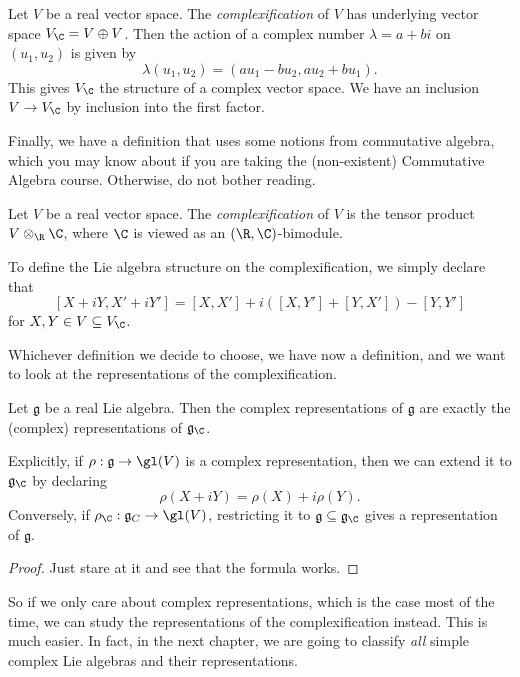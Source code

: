 \documentclass[a4paper]{article}
\begin{document}
\begin{defi}[Complexification II]
  Let $V$ be a real vector space. The \emph{complexification} of $V$ has underlying vector space $V_\C = V \oplus V$. Then the action of a complex number $\lambda = a + bi$ on $(u_1, u_2)$ is given by
  \[
    \lambda (u_1, u_2) = (au_1 - bu_2, a u_2 + bu_1).
  \]
  This gives $V_\C$ the structure of a complex vector space. We have an inclusion $V \to V_\C$ by inclusion into the first factor.
\end{defi}

Finally, we have a definition that uses some notions from commutative algebra, which you may know about if you are taking the (non-existent) Commutative Algebra course. Otherwise, do not bother reading.
\begin{defi}
  Let $V$ be a real vector space. The \emph{complexification} of $V$ is the tensor product $V \otimes_\R \C$, where $\C$ is viewed as an $(\R, \C)$-bimodule.
\end{defi}

To define the Lie algebra structure on the complexification, we simply declare that
\[
  [X + iY, X' + i Y'] = [X, X'] + i([X, Y'] + [Y, X']) - [Y, Y']
\]
for $X, Y \in V \subseteq V_\C$.

Whichever definition we decide to choose, we have now a definition, and we want to look at the representations of the complexification.

\begin{thm}
  Let $\mathfrak{g}$ be a real Lie algebra. Then the complex representations of $\mathfrak{g}$ are exactly the (complex) representations of $\mathfrak{g}_\C$.

  Explicitly, if $\rho: \mathfrak{g} \to \gl(V)$ is a complex representation, then we can extend it to $\mathfrak{g}_\C$ by declaring
  \[
    \rho(X + iY) = \rho(X) + i \rho(Y).
  \]
  Conversely, if $\rho_\C: \mathfrak{g}_C \to \gl(V)$, restricting it to $\mathfrak{g} \subseteq \mathfrak{g}_\C$ gives a representation of $\mathfrak{g}$.
\end{thm}

\begin{proof}
  Just stare at it and see that the formula works.
\end{proof}

So if we only care about complex representations, which is the case most of the time, we can study the representations of the complexification instead. This is much easier. In fact, in the next chapter, we are going to classify \emph{all} simple complex Lie algebras and their representations.
\end{document}
